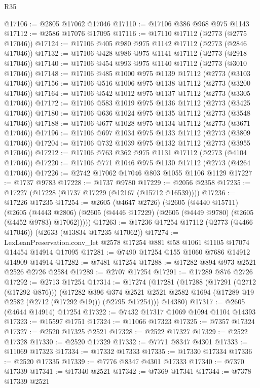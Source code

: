\begin{lexlean}{R35}
\begin{coremodule}
@17106 := @2805 @17062 @17046
@17110 := @17106 @386 @968 @975 @1143
@17112 := @2586 @17076 @17095
@17116 := @17110 @17112 (@2773 (@2775 @17046))
@17124 := @17106 @405 @980 @975 @1142 @17112 (@2773 (@2846 @17046))
@17132 := @17106 @428 @986 @975 @1141 @17112 (@2773 (@2918 @17046))
@17140 := @17106 @454 @993 @975 @1140 @17112 (@2773 (@3010 @17046))
@17148 := @17106 @485 @1000 @975 @1139 @17112 (@2773 (@3103 @17046))
@17156 := @17106 @516 @1006 @975 @1138 @17112 (@2773 (@3200 @17046))
@17164 := @17106 @542 @1012 @975 @1137 @17112 (@2773 (@3305 @17046))
@17172 := @17106 @583 @1019 @975 @1136 @17112 (@2773 (@3425 @17046))
@17180 := @17106 @636 @1024 @975 @1135 @17112 (@2773 (@3548 @17046))
@17188 := @17106 @677 @1028 @975 @1134 @17112 (@2773 (@3671 @17046))
@17196 := @17106 @697 @1034 @975 @1133 @17112 (@2773 (@3809 @17046))
@17204 := @17106 @732 @1039 @975 @1132 @17112 (@2773 (@3955 @17046))
@17212 := @17106 @763 @362 @975 @1131 @17112 (@2773 (@4104 @17046))
@17220 := @17106 @771 @1046 @975 @1130 @17112 (@2773 (@4264 @17046))
@17226 := @2742 @17062 @17046 @803 @1055 @1106 @1129
@17227 := @1737 @9783
@17228 := @1737 @9780
@17229 := @2056 @2358
@17235 := @17227 (@17228 (@1737 @17229 (@12167 (@15712 @16539))))
@17236 := @17226 @17235
@17254 := @2605
    (@4647 @2726)
    (@2605
      (@4440 @15711)
      (@2605
        (@4443 @2806)
        (@2605 (@4446 @17229) (@2605 (@4449 @9780) (@2605 (@4452 @9783) @17062)))))
@17263 := @17236 @17254 @17112 (@2773 (@4466 @17046)) (@2633 (@13834 @17235 @17062))
@17274 := LexLeanPreservation.conv_let @2578 @17254 @881 @58 @1061 @1105 @17074 @14454 @14914 @17095
@17281 := @7490 @17254 @155 @1060 @7686 @14912 @14909 @14914
@17282 := @7481 @17254
@17288 := @17282 @894 @973 @2521 @2526 @2726 @2584
@17289 := @2707 @17254
@17291 := @17289 @876 @2726
@17292 := @2713 @17254
@17314 := @17274
    (@17281
      (@17288
        (@17291 (@2712 (@17292 @876)))
        (@17282
          @396
          @374
          @2521
          @2521
          @2582
          @1694
          (@17289 @19 @2582 (@2712 (@17292 @19)))
          (@2795 @17254)))
      @14380)
@17317 := @2605 (@4644 @14914) @17254
@17322 := @7432 @17317 @1069 @1094 @1104 @14393
@17323 := @15597 @1751
@17324 := @11066 @17323
@17325 := @7357 @17324
@17327 := @2520 @17325 @2521
@17328 := @2522 @17327
@17329 := @2522 @17328
@17330 := @2520 @17329
@17332 := @7771 @8347 @4301
@17333 := @11069 @17323
@17334 := @17332 @17333
@17335 := @17330 @17334
@17336 := @2520 @17335
@17339 := @7776 @8347 @4301 @17333
@17340 := @7370 @17339
@17341 := @17340 @2521
@17342 := @7369 @17341
@17344 := @7378 @17339 @2521

\end{coremodule}
\end{lexlean}
